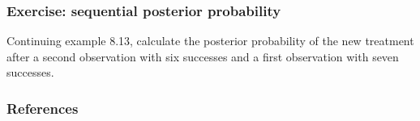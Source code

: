 \begin{frame}
    \frametitle{Exercise: sequential posterior probability}

    Continuing example 8.13, calculate the posterior probability of the new
    treatment after a second observation with six successes and a first
    observation with seven successes.

\end{frame}

\begin{frame}
    \frametitle{References}

    \tiny{
        
        
    }
\end{frame}

\begin{comment}
\end{comment}



